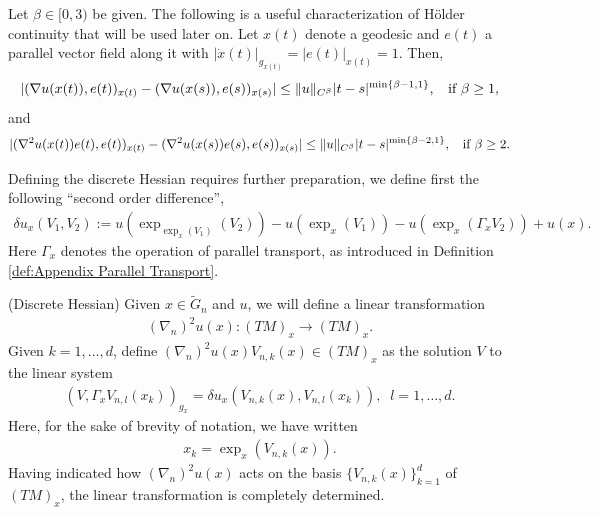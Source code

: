 \documentclass[11pt,reqno]{amsart}
\numberwithin{equation}{section}
\theoremstyle{plain}
\begin{document}
\begin{rem}\label{rem: Holder regularity gradient and Hessian} Let $\beta \in [0,3)$ be given. The following is a useful characterization of H\"older continuity that will be used later on.  Let $x(t)$ denote a geodesic and $e(t)$ a parallel vector field along it with $|\dot x(t)|_{g_{x(t)}}=|e(t)|_{x(t)}=1$. Then,
\begin{align*}
  |(\nabla u(x(t)),e(t))_{x(t)}-(\nabla u(x(s)),e(s))_{x(s)}|\leq \|u\|_{C^\beta}|t-s|^{\min\{\beta-1,1\}},\;\;\textnormal{ if } \beta\geq 1,
\end{align*}
and
\begin{align*}
  |(\nabla^2 u(x(t))e(t),e(t))_{x(t)}-(\nabla^2 u(x(s))e(s),e(s))_{x(s)}|\leq \|u\|_{C^\beta}|t-s|^{\min\{\beta-2,1\}},\;\;\textnormal{ if } \beta \geq 2.
\end{align*}

\end{rem}

Defining the discrete Hessian requires further preparation, we define first the following ``second order difference'',
\begin{align*}
  \delta u_{x}(V_1,V_2) := u(\exp_{\exp_x(V_1)}(V_2))-u(\exp_x(V_1))-u(\exp_{x}(\Gamma_{x}V_2))+u(x).
\end{align*}
Here $\Gamma_{x}$ denotes the operation of parallel transport, as introduced in Definition \ref{def:Appendix Parallel Transport}.


\begin{DEF}\label{def:Appendix Discrete Hessian} (Discrete Hessian)
  Given $x\in \tilde G_n$ and $u$, we will define a linear transformation
  \begin{align*}
   (\nabla_n)^2u(x): (TM)_x \to (TM)_x.
  \end{align*}
  Given $k=1,\ldots,d$, define $(\nabla_n)^2u(x)V_{n,k}(x) \in (TM)_x$ as the solution $V$ to the linear system
  \begin{align*}
    (V,\Gamma_{x}V_{n,l}(x_k))_{g_x} = \delta u_{x}(V_{n,k}(x),V_{n,l}(x_k)),\;\;l=1,\ldots,d.
  \end{align*}	       
  Here, for the sake of brevity of notation, we have written
  \begin{align*}
    x_{k} = \exp_{x}(V_{n,k}(x)).	  
  \end{align*}	   
  Having indicated how $(\nabla_n)^2u(x)$ acts on the basis $\{V_{n,k}(x)\}_{k=1}^d$ of $(TM)_x$, the linear transformation is completely determined.
  
\end{DEF}
\end{document}
